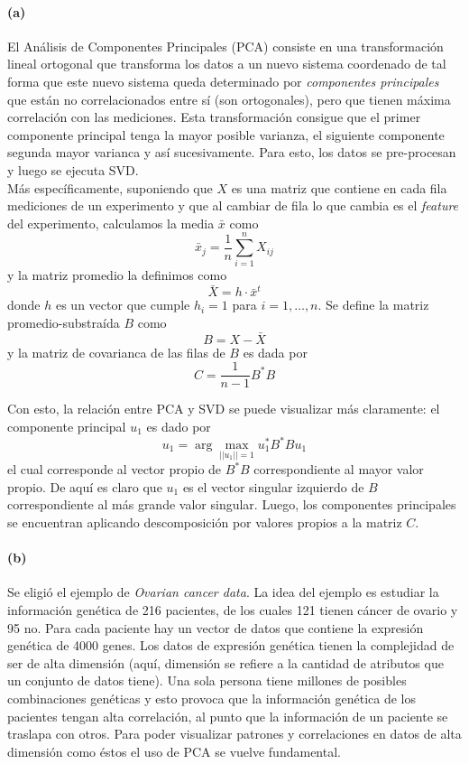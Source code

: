 \paragraph{(a)}
El An\'alisis de Componentes Principales (PCA) consiste en una transformaci\'on lineal ortogonal que transforma los datos
a un nuevo sistema coordenado de tal forma que este nuevo sistema queda determinado por \textit{componentes principales}
que est\'an no correlacionados entre s\'i (son ortogonales), pero que tienen m\'axima correlaci\'on con las mediciones.
Esta transformaci\'on consigue que el primer componente principal tenga la mayor posible varianza, el siguiente componente segunda
mayor varianca y as\'i sucesivamente. Para esto, los datos se pre-procesan y luego se ejecuta SVD. 
\\
M\'as espec\'ificamente, suponiendo que $X$ es una matriz que contiene en cada fila mediciones de un experimento y que al cambiar de fila
lo que cambia es el \textit{feature} del experimento, calculamos la media $\bar{x}$ como 
\[\bar{x}_j = \frac{1}{n}\sum_{i=1}^nX_{ij} \]
y la matriz promedio la definimos como 
\[\bar{X} = h\cdot\bar{x}^t \]
donde $h$ es un vector que cumple $h_i = 1$ para $i=1,\ldots,n$. Se define la matriz promedio-substra\'ida $B$ como
\[ B = X-\bar{X} \]
y la matriz de covarianca de las filas de $B$ es dada por
\[ C = \frac{1}{n-1}B^*B \]

Con esto, la relaci\'on entre PCA y SVD se puede visualizar m\'as claramente: el componente principal $u_1$ es dado por
\[ u_1 = \arg \max_{||u_1||=1} u_1^*B^*Bu_1 \]
el cual corresponde al vector propio de $B^*B$ correspondiente al mayor valor propio. De aqu\'i es claro que $u_1$ es el vector singular 
izquierdo de $B$ correspondiente al m\'as grande valor singular. Luego, los componentes principales se 
encuentran  aplicando descomposici\'on por valores propios a la matriz $C$.\\
\paragraph{(b)}
Se eligi\'o el ejemplo de \textit{Ovarian cancer data}. La idea del ejemplo es estudiar la informaci\'on
gen\'etica de 216 pacientes, de los cuales 121 tienen c\'ancer de ovario y 95 no. Para cada paciente
hay un vector de datos que contiene la expresi\'on gen\'etica de 4000 genes. Los datos de expresi\'on gen\'etica tienen la complejidad de ser de alta dimensi\'on (aqu\'i, dimensi\'on se refiere a la cantidad de 
atributos que un conjunto de datos tiene). Una sola persona tiene millones de posibles combinaciones gen\'eticas y esto provoca
que la informaci\'on gen\'etica de los pacientes tengan alta correlaci\'on, al punto que la informaci\'on de un paciente se traslapa
con otros. Para poder visualizar patrones y correlaciones
en datos de alta dimensi\'on como \'estos el uso de PCA se vuelve fundamental.\\
